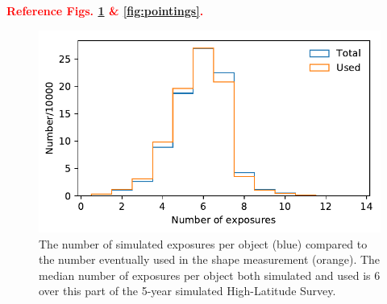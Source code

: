 \documentclass[aps,prd, amsmath,amssymb,superscriptaddress,showkeys,nofootinbib,reprint,preprintnumbers]{revtex4-1}
\newcommand{\verify}[1]{\textcolor{red}{\textbf{{#1}}}}
\begin{document}
\verify{Reference Figs. \ref{fig:hist2} \& \ref{fig:pointings}.}

\begin{figure}
\begin{center}
\includegraphics[width=\columnwidth]{figures/hist2.pdf}
\end{center}
\caption[]{
The number of simulated exposures per object (blue) compared to the number eventually used in the shape measurement (orange). The median number of exposures per object both simulated and used is 6 over this part of the 5-year simulated High-Latitude Survey.
\label{fig:hist2}}
\end{figure}
\end{document}
